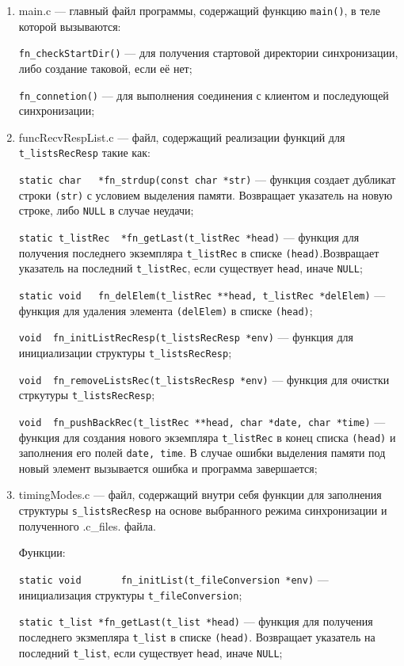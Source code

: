 \begin{enumerate}
	\item main.c --- главный файл программы, содержащий функцию \verb|main()|, в теле которой вызываются: 
	
	\verb|fn_checkStartDir()| --- для получения стартовой директории синхронизации, либо создание таковой, если её нет; 
	
	\verb|fn_connetion()| --- для выполнения соединения с клиентом и последующей синхронизации;
	\item funcRecvRespList.c --- файл, содержащий реализации функций для \verb|t_listsRecResp| такие как: 
	
	\verb|static char	*fn_strdup(const char *str)| --- функция создает дубликат строки \verb|(str)| с условием выделения памяти. Возвращает указатель на новую строке, либо \verb|NULL| в случае неудачи;
	
	\verb|static t_listRec	*fn_getLast(t_listRec *head)| --- функция для получения последнего экземпляра \verb|t_listRec| в списке \verb|(head)|.Возвращает указатель на последний \verb|t_listRec|, если существует \verb|head|, иначе \verb|NULL|;
	
	\verb|static void	fn_delElem(t_listRec **head, t_listRec *delElem)| --- функция для удаления элемента \verb|(delElem)| в списке \verb|(head)|;
	
	\verb|void	fn_initListRecResp(t_listsRecResp *env)| --- функция для инициализации структуры \verb|t_listsRecResp|;
	
	\verb|void	fn_removeListsRec(t_listsRecResp *env)| --- функция для очистки стркутуры \verb|t_listsRecResp|;
	
	\verb|void	fn_pushBackRec(t_listRec **head, char *date, char *time)| ---  функция для создания нового экземпляра \verb|t_listRec| в конец списка \verb|(head)| и заполнения его полей \verb|date, time|. В случае ошибки выделения памяти под новый элемент вызывается ошибка и программа завершается;
	
	\item  timingModes.c --- файл, содержащий внутри себя функции для заполнения структуры \verb|s_listsRecResp| на основе выбранного режима синхронизации и полученного .c\_files.  файла.
	
	Функции:
	
	\verb|static void		fn_initList(t_fileConversion *env)| --- инициализация структуры \verb|t_fileConversion|;
	
	\verb|static t_list	*fn_getLast(t_list *head)| --- функция для получения последнего экзмепляра \verb|t_list| в списке \verb|(head)|. Возвращает указатель на последний \verb|t_list|, если существует \verb|head|, иначе \verb|NULL|;
	

\end{enumerate}
